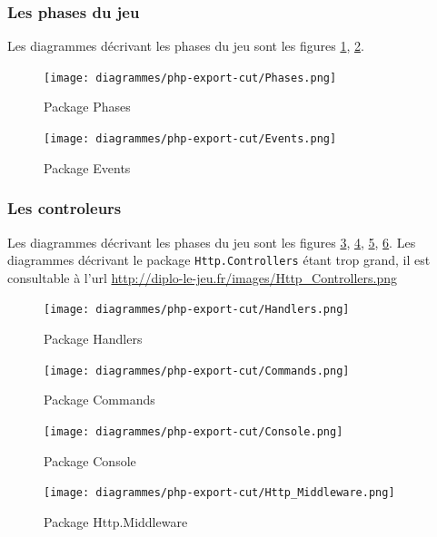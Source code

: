         \newpage
        \subsubsection{Les phases du jeu}
        Les diagrammes décrivant les phases du jeu sont les figures \ref{pphases}, \ref{pevents}.

			\begin{figure}[!h]
				\centering
                \texttt{[image: diagrammes/php-export-cut/Phases.png]}
                \caption{\label{pphases}Package Phases}
			\end{figure}

			\begin{figure}[!h]
				\centering
                \texttt{[image: diagrammes/php-export-cut/Events.png]}
                \caption{\label{pevents}Package Events}
			\end{figure}
        
        \newpage
        \subsubsection{Les controleurs}
        Les diagrammes décrivant les phases du jeu sont les figures \ref{phandlers}, \ref{pcommands}, \ref{pconsole}, \ref{phmiddleware}.
        Les diagrammes décrivant le package \verb|Http.Controllers| étant trop
        grand, il est consultable à l'url \url{http://diplo-le-jeu.fr/images/Http\_Controllers.png}

			\begin{figure}[!h]
				\centering
                \texttt{[image: diagrammes/php-export-cut/Handlers.png]}
                \caption{\label{phandlers}Package Handlers}
			\end{figure}

			\begin{figure}[!h]
				\centering
                \texttt{[image: diagrammes/php-export-cut/Commands.png]}
                \caption{\label{pcommands}Package Commands}
			\end{figure}

			\begin{figure}[!h]
				\centering
                \texttt{[image: diagrammes/php-export-cut/Console.png]}
                \caption{\label{pconsole}Package Console}
			\end{figure}

			\begin{figure}[!h]
				\centering
                \texttt{[image: diagrammes/php-export-cut/Http\_Middleware.png]}
                \caption{\label{phmiddleware}Package Http.Middleware}
			\end{figure}

